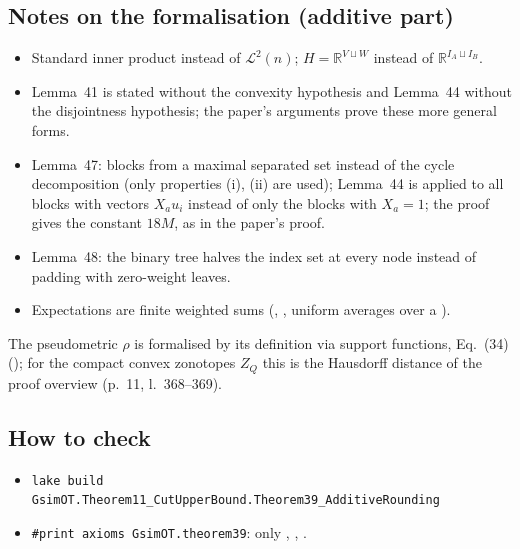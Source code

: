 \subsection{Notes on the formalisation (additive part)}
\begin{itemize}
\item Standard inner product instead of $\mathcal L^2(n)$; $H=\mathbb R^{V\sqcup W}$ instead of $\mathbb R^{I_A\sqcup I_B}$.
\item Lemma~41 is stated without the convexity hypothesis and Lemma~44 without the disjointness hypothesis;
  the paper's arguments prove these more general forms.
\item Lemma~47: blocks from a maximal separated set instead of the cycle decomposition (only properties (i), (ii)
  are used); Lemma~44 is applied to all blocks with vectors $X_au_i$ instead of only the blocks with $X_a=1$;
  the proof gives the constant $18M$, as in the paper's proof.
\item Lemma~48: the binary tree halves the index set at every node instead of padding with zero-weight leaves.
\item Expectations are finite weighted sums (, , uniform averages over a ).
\end{itemize}
The pseudometric $\rho$ is formalised by its definition via support functions, Eq.~(34) (); for the
compact convex zonotopes $Z_Q$ this is the Hausdorff distance of the proof overview (p.~11, l.~368--369).

\subsection{How to check}
\begin{itemize}
\item \texttt{lake build GsimOT.Theorem11\_CutUpperBound.Theorem39\_AdditiveRounding}
\item \texttt{\#print axioms GsimOT.theorem39}: only , , .
\end{itemize}
